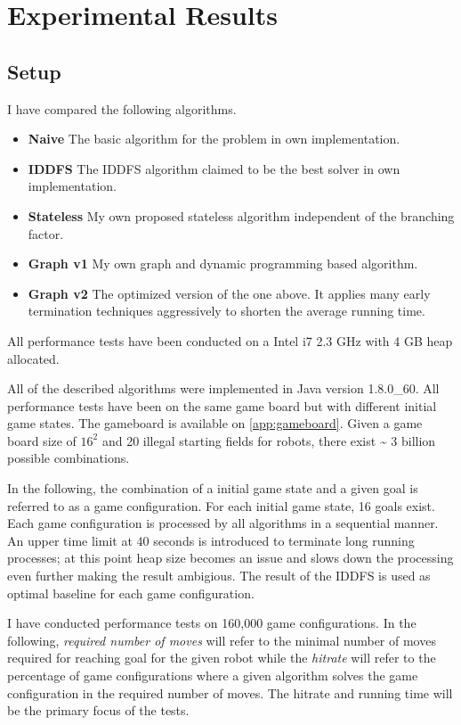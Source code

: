 \documentclass[]{article}
\providecommand{\tightlist}{%
  \setlength{\itemsep}{0pt}\setlength{\parskip}{0pt}}
\begin{document}
\section{Experimental Results}\label{experimental-results}

\subsection{Setup}\label{setup}

I have compared the following algorithms.

\begin{itemize}
\tightlist
\item
  \textbf{Naive} The basic algorithm for the problem in own
  implementation.
\item
  \textbf{IDDFS} The IDDFS algorithm claimed to be the best solver in
  own implementation.
\item
  \textbf{Stateless} My own proposed stateless algorithm independent of
  the branching factor.
\item
  \textbf{Graph v1} My own graph and dynamic programming based
  algorithm.
\item
  \textbf{Graph v2} The optimized version of the one above. It applies
  many early termination techniques aggressively to shorten the average
  running time.
\end{itemize}

All performance tests have been conducted on a Intel i7 2.3 GHz with 4
GB heap allocated.

All of the described algorithms were implemented in Java version
1.8.0\_60. All performance tests have been on the same game board but
with different initial game states. The gameboard is available on
\ref{app:gameboard}. Given a game board size of \(16^2\) and 20 illegal
starting fields for robots, there exist \textasciitilde{} 3 billion
possible combinations.

In the following, the combination of a initial game state and a given
goal is referred to as a game configuration. For each initial game
state, 16 goals exist. Each game configuration is processed by all
algorithms in a sequential manner. An upper time limit at 40 seconds is
introduced to terminate long running processes; at this point heap size
becomes an issue and slows down the processing even further making the
result ambigious. The result of the IDDFS is used as optimal baseline
for each game configuration.

I have conducted performance tests on 160,000 game configurations. In
the following, \emph{required number of moves} will refer to the minimal
number of moves required for reaching goal for the given robot while the
\emph{hitrate} will refer to the percentage of game configurations where
a given algorithm solves the game configuration in the required number
of moves. The hitrate and running time will be the primary focus of the
tests.
\end{document}
